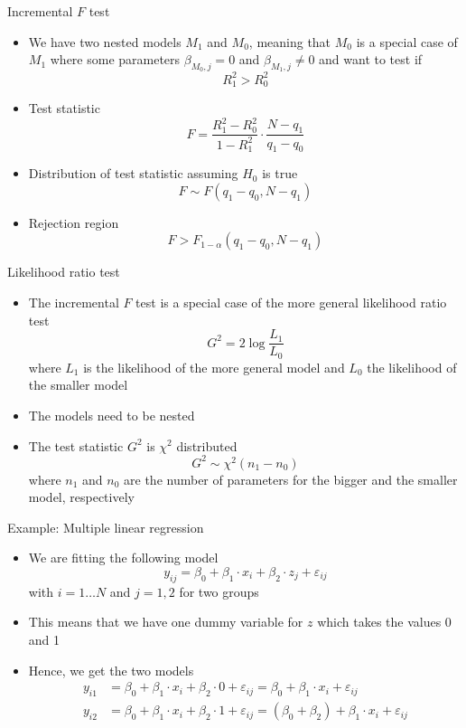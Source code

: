 \documentclass[aspectratio=169]{beamer}
\begin{document}
\begin{frame}{Incremental $F$ test}
  \begin{itemize}
    \item We have two nested models $M_1$ and $M_0$, meaning that $M_0$ is a
      special case of $M_1$ where some parameters $\beta_{M_0,j} = 0$ and
      $\beta_{M_1,j} \neq 0$ and want to test if
  \[
    R_1^2 > R_0^2
  \]
  \item Test statistic
    \[
      F = \frac{R^2_1 - R^2_0}{1 - R^2_1} \cdot \frac{N - q_1}{q_1 - q_0}
    \]
  \item Distribution of test statistic assuming $H_0$ is true
    \[
      F \sim F(q_1 - q_0, N - q_1)
    \]
  \item Rejection region
    \[
      F > F_{1-\alpha} (q_1 - q_0, N - q_1)
    \]
  \end{itemize}
\end{frame}

\begin{frame}{Likelihood ratio test}
  \begin{itemize}
    \item The incremental $F$ test is a special case of the more general
      likelihood ratio test
      \[
        G^2 = 2 \log \frac{L_1}{L_0}
      \]
      where $L_1$ is the likelihood of the more general model and $L_0$ the
      likelihood of the smaller model
    \item The models need to be nested
    \item The test statistic $G^2$ is $\chi^2$ distributed
      \[
        G^2 \sim \chi^2(n_1 - n_0)
      \]
      where $n_1$ and $n_0$ are the number of parameters for the bigger and the
      smaller model, respectively
  \end{itemize}
\end{frame}

\begin{frame}[fragile]{Example: Multiple linear regression}
  \begin{itemize}
    \item We are fitting the following model
\[
y_{ij} = \beta_0 + \beta_1 \cdot x_i + \beta_2 \cdot z_j + \varepsilon_{ij}
\]
with $i = 1 \ldots N$ and $j = 1,2$ for two groups
\item This means that we have one dummy variable for $z$ which takes the
  values 0 and 1
\item Hence, we get the two models
\begin{align*}
y_{i1} & = \beta_0 + \beta_1 \cdot x_i + \beta_2\cdot 0 + \varepsilon_{ij}
= \beta_0 + \beta_1 \cdot x_i + \varepsilon_{ij}\\
y_{i2} & = \beta_0 + \beta_1 \cdot x_i + \beta_2\cdot 1 + \varepsilon_{ij}
= (\beta_0 + \beta_2) + \beta_1 \cdot x_i + \varepsilon_{ij}
\end{align*}
  \end{itemize}
\end{frame}
\end{document}
